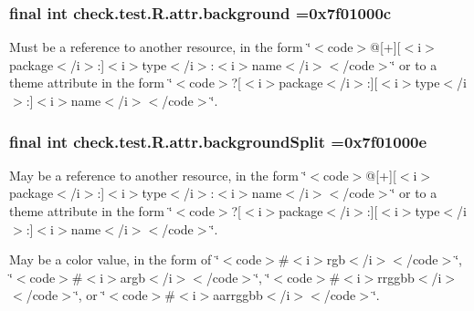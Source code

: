 \subsubsection[{background}]{\setlength{\rightskip}{0pt plus 5cm}final int check.\+test.\+R.\+attr.\+background =0x7f01000c\hspace{0.3cm}{\ttfamily [static]}}\label{classcheck_1_1test_1_1_r_1_1attr_a5de53cfcc8516df6498e3a9365fccecb}
Must be a reference to another resource, in the form \char`\"{}$<$code$>$@\mbox{[}+\mbox{]}\mbox{[}$<$i$>$package$<$/i$>$\+:\mbox{]}$<$i$>$type$<$/i$>$\+:$<$i$>$name$<$/i$>$$<$/code$>$\char`\"{} or to a theme attribute in the form \char`\"{}$<$code$>$?\mbox{[}$<$i$>$package$<$/i$>$\+:\mbox{]}\mbox{[}$<$i$>$type$<$/i$>$\+:\mbox{]}$<$i$>$name$<$/i$>$$<$/code$>$\char`\"{}. \hypertarget{classcheck_1_1test_1_1_r_1_1attr_ab1f7b7ff195fede33bbdf5e4010cb312}{}
\subsubsection[{background\+Split}]{\setlength{\rightskip}{0pt plus 5cm}final int check.\+test.\+R.\+attr.\+background\+Split =0x7f01000e\hspace{0.3cm}{\ttfamily [static]}}\label{classcheck_1_1test_1_1_r_1_1attr_ab1f7b7ff195fede33bbdf5e4010cb312}
May be a reference to another resource, in the form \char`\"{}$<$code$>$@\mbox{[}+\mbox{]}\mbox{[}$<$i$>$package$<$/i$>$\+:\mbox{]}$<$i$>$type$<$/i$>$\+:$<$i$>$name$<$/i$>$$<$/code$>$\char`\"{} or to a theme attribute in the form \char`\"{}$<$code$>$?\mbox{[}$<$i$>$package$<$/i$>$\+:\mbox{]}\mbox{[}$<$i$>$type$<$/i$>$\+:\mbox{]}$<$i$>$name$<$/i$>$$<$/code$>$\char`\"{}. 

May be a color value, in the form of \char`\"{}$<$code$>$\#$<$i$>$rgb$<$/i$>$$<$/code$>$\char`\"{}, \char`\"{}$<$code$>$\#$<$i$>$argb$<$/i$>$$<$/code$>$\char`\"{}, \char`\"{}$<$code$>$\#$<$i$>$rrggbb$<$/i$>$$<$/code$>$\char`\"{}, or \char`\"{}$<$code$>$\#$<$i$>$aarrggbb$<$/i$>$$<$/code$>$\char`\"{}. \hypertarget{classcheck_1_1test_1_1_r_1_1attr_a003c234c1dbf40a537758be65695c08b}{}
